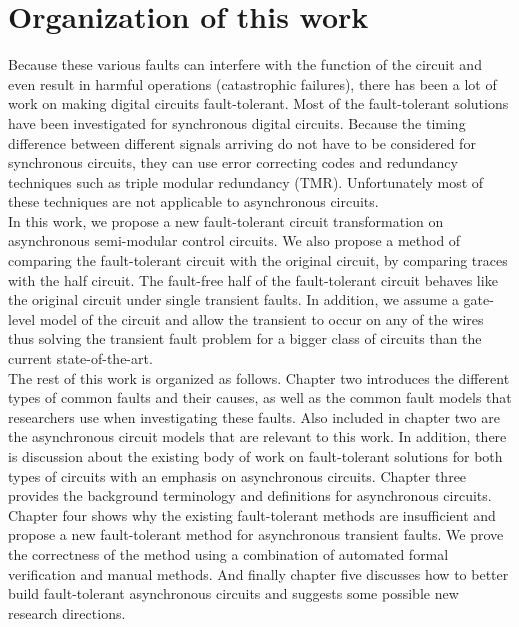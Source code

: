 \documentclass[12pt]{report}
\begin{document}
\section{Organization of this work}
Because these various faults can interfere with the function of the circuit and even result in harmful operations (catastrophic failures), there has been a lot of work on making digital circuits fault-tolerant. Most of the fault-tolerant solutions have been investigated for synchronous digital circuits.  Because the timing difference between different signals arriving do not have to be considered for synchronous circuits, they can use error correcting codes and redundancy techniques such as triple modular redundancy (TMR). Unfortunately most of these techniques are not applicable to asynchronous circuits.\\

In this work, we propose a new fault-tolerant circuit transformation on asynchronous semi-modular control circuits.  We also propose a method of comparing the fault-tolerant circuit with the original circuit, by comparing traces with the half circuit.  The fault-free half of the fault-tolerant circuit behaves like the original circuit under single transient faults.  In addition, we assume a gate-level model of the circuit and allow the transient to occur on any of the wires thus solving the transient fault problem for a bigger class of circuits than the current state-of-the-art.\\

The rest of this work is organized as follows.  Chapter two introduces the different types of common faults and their causes, as well as the common fault models that researchers use when investigating these faults.  Also included in chapter two are the asynchronous circuit models that are relevant to this work.  In addition, there is discussion about the existing body of work on fault-tolerant solutions for both types of circuits with an emphasis on asynchronous circuits.  Chapter three provides the background terminology and definitions for asynchronous circuits.  Chapter four shows why the existing fault-tolerant methods are insufficient and propose a new fault-tolerant method for asynchronous transient faults.  We prove the correctness of the method using a combination of automated formal verification and manual methods.  And finally chapter five discusses how to better build fault-tolerant asynchronous circuits and suggests some possible new research directions.
\end{document}
